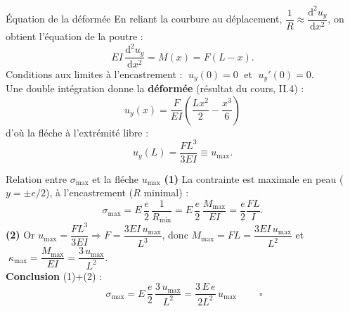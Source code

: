 \documentclass[11pt,aspectratio=169]{beamer}
\begin{document}
\begin{frame}{Équation de la déformée}
  \footnotesize
  En reliant la courbure au déplacement, $\dfrac{1}{R}\approx\dfrac{\mathrm{d}^{2}u_y}{\mathrm{d}x^{2}}$,
  on obtient l'équation de la poutre :
  \[ EI\,\frac{\mathrm{d}^{2}u_y}{\mathrm{d}x^{2}}=M(x)=F(L-x). \]
  Conditions aux limites à l'encastrement : $\;u_y(0)=0\;$ et $\;u_y'(0)=0.$
  \medskip\\
  Une double intégration donne la \textbf{déformée} (résultat du cours, II.4) :
  \[ \boxed{\;u_y(x)=\frac{F}{EI}\left(\frac{L x^{2}}{2}-\frac{x^{3}}{6}\right)\;} \]
  d'où la fléche à l'extrémité libre :
  \[ u_{y}(L)=\frac{F L^{3}}{3EI}\equiv u_{\max}. \]
\end{frame}

\begin{frame}{Relation entre $\sigma_{\max}$ et la fléche $u_{\max}$}
  \footnotesize
  \textbf{(1)} La contrainte est maximale en peau ($y=\pm e/2$), à l'encastrement
  ($R$ minimal) :
  \[ \sigma_{\max}=E\,\frac{e}{2}\,\frac{1}{R_{\min}}
      =E\,\frac{e}{2}\,\frac{M_{\max}}{EI}=\frac{e}{2}\frac{FL}{I}. \]
  \textbf{(2)} Or $u_{\max}=\dfrac{FL^{3}}{3EI}\Rightarrow F=\dfrac{3EI\,u_{\max}}{L^{3}}$,
  donc $M_{\max}=FL=\dfrac{3EI\,u_{\max}}{L^{2}}$ et
  $\;\kappa_{\max}=\dfrac{M_{\max}}{EI}=\dfrac{3\,u_{\max}}{L^{2}}.$
  \medskip\\
  \textbf{Conclusion} (1)+(2) :
  \[ \boxed{\;\sigma_{\max}=E\,\frac{e}{2}\,\frac{3\,u_{\max}}{L^{2}}
      =\frac{3\,E\,e}{2L^{2}}\,u_{\max}\;}\qquad\square \]
\end{frame}
\end{document}
